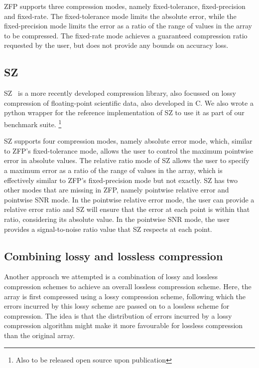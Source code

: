 ZFP supports three compression modes, namely fixed-tolerance, fixed-precision
and fixed-rate. The fixed-tolerance mode limits the absolute error, while the
fixed-precision mode limits the error as a ratio of the range of values in the array to be compressed.
The fixed-rate mode achieves a guaranteed compression ratio requested by the
user, but does not provide any bounds on accuracy loss.


\subsection{SZ}
SZ~\cite{di2018efficient} is a more recently developed compression library, also focussed on lossy compression
of floating-point scientific data, also developed in C. We also wrote a python wrapper for the reference
implementation of SZ to use it as part of our benchmark suite. \footnote{Also to be released open source
upon publication}

SZ supports four compression modes, namely absolute error mode, which, similar to ZFP's fixed-tolerance
mode, allows the user to control the maximum pointwise error in absolute values. The relative ratio mode 
of SZ allows the user to specify a maximum error as a ratio of the range of values in the array, which is
effectively similar to ZFP's fixed-precision mode but not exactly. SZ has two other modes that are missing 
in ZFP, namely pointwise relative error and pointwise SNR mode. In the pointwise relative error mode, the user
can provide a relative error ratio and SZ will ensure that the error at each point is within that ratio, considering
its absolute value. In the pointwise SNR mode, the user provides a signal-to-noise ratio value that SZ respects
at each point.

\subsection{Combining lossy and lossless compression}
Another approach we attempted is a combination of lossy and lossless compression 
schemes to achieve an overall lossless compression scheme. Here, the array is first compressed using a 
lossy compression scheme, following which the errors incurred by this lossy scheme are passed on to a 
lossless scheme for compression. The idea is that the distribution of errors incurred by a lossy compression
algorithm might make it more favourable for lossless compression than the original array.